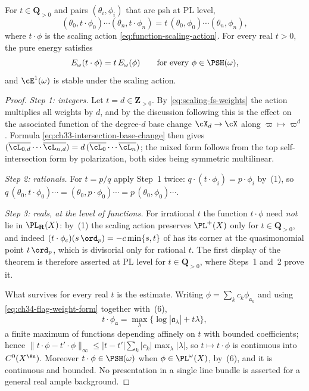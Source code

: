 \begin{theorem}
\label{thm:ch46-energy-homogeneous}
For $t\in\mathbf Q_{>0}$ and pairs $(\theta_i,\phi_i)$ that are psh at
PL level,
\[
 (\theta_0,t\cdot\phi_0)\cdots(\theta_n,t\cdot\phi_n)
 =t\,(\theta_0,\phi_0)\cdots(\theta_n,\phi_n),
\]
where $t\cdot\phi$ is the scaling action
\eqref{eq:function-scaling-action}.  For every real $t>0$, the pure energy
satisfies
\[
 E_\omega(t\cdot\phi)=t\,E_\omega(\phi)
 \qquad\text{for every }\phi\in\PSH(\omega),
\]
and $\cE^1(\omega)$ is stable under the scaling action.
\end{theorem}

\begin{proof}
\emph{Step 1: integers.}  Let $t=d\in\mathbf Z_{>0}$.  By
\eqref{eq:scaling-fs-weights} the action multiplies all weights by $d$,
and by the discussion following
 this is the effect on the
associated function of the degree-$d$ base change $\cX_d\to\cX$ along
$\varpi\mapsto\varpi^d$.  Formula
\eqref{eq:ch33-intersection-base-change} then gives
$(\overline{\cL_{0,d}}\cdots\overline{\cL_{n,d}})
 =d\,(\overline{\cL_0}\cdots\overline{\cL_n})$; the mixed form follows
from the top self-intersection form by polarization, both sides being
symmetric multilinear.

\emph{Step 2: rationals.}  For $t=p/q$ apply Step~1 twice:
$q\cdot(t\cdot\phi_i)=p\cdot\phi_i$ by
\,(1), so
$q\,(\theta_0,t\cdot\phi_0)\cdots=(\theta_0,p\cdot\phi_0)\cdots
 =p\,(\theta_0,\phi_0)\cdots$.

\emph{Step 3: reals, at the level of functions.}  For irrational $t$ the
function $t\cdot\phi$ need \emph{not} lie in $\PL_{\mathbf R}(X)$: by
\,(1) the scaling action preserves
$\PL^+(X)$ only for $t\in\mathbf Q_{>0}$, and indeed
$(t\cdot\phi_c)(s\,\ord_p)=-c\min\{s,t\}$ of
 has its corner at the quasimonomial point
$t\,\ord_p$, which is divisorial only for rational $t$.  The first
display of the theorem is therefore asserted at PL level for
$t\in\mathbf Q_{>0}$, where Steps~1 and~2 prove it.

What survives for every real $t$ is the estimate.  Writing
$\phi=\sum_kc_k\phi_{\mathfrak a_k}$ and using
\eqref{eq:ch34-flag-weight-form} together with
\,(6),
\[
 t\cdot\phi_{\mathfrak a}
 =\max_{\lambda}\{\log|\mathfrak a_\lambda|+t\lambda\},
\]
a finite maximum of functions depending affinely on $t$ with bounded
coefficients; hence
$\lVert t\cdot\phi-t'\cdot\phi\rVert_\infty
 \le|t-t'|\sum_k|c_k|\max_\lambda|\lambda|$, so $t\mapsto t\cdot\phi$ is
continuous into $C^0(X^{\An})$.  Moreover
$t\cdot\phi\in\PSH(\omega)$ when $\phi\in\PL^{\omega}(X)$,
by \,(6), and it is continuous and bounded.
No presentation in a single line bundle is asserted for a general real
ample background.


\end{proof}
